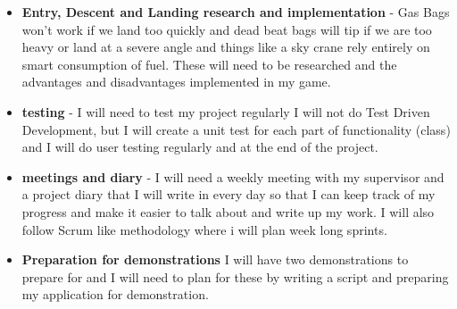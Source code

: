 \documentclass[11pt,fleqn,twoside]{article}
\begin{document}
\begin{itemize}
\item \textbf{Entry, Descent and Landing research and implementation} - Gas Bags won't work if we land too quickly and dead beat bags will tip if we are too heavy or land at a severe angle and things like a sky crane rely entirely on smart consumption of fuel. These will need to be researched and the advantages and disadvantages implemented in my game.
\item \textbf{testing} - I will need to test my project regularly I will not do Test Driven Development, but I will create a unit test for each part of functionality (class) and I will do user testing regularly and at the end of the project.
\item \textbf{meetings and diary} - I will need a weekly meeting with my supervisor and a project diary that I will write in every day so that I can keep track of my progress and make it easier to talk about and write up my work. I will also follow Scrum like methodology where i will plan week long sprints.
\item \textbf{Preparation for demonstrations} I will have two demonstrations to prepare for and I will need to plan for these by writing a script and preparing my application for demonstration.

\end{itemize}
\end{document}
